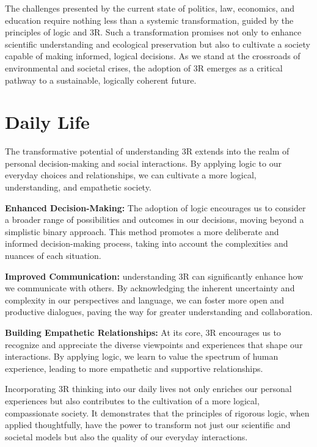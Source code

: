 \documentclass[12pt]{article}
\begin{document}
The challenges presented by the current state of politics, law, economics, and education require nothing less than a systemic transformation, guided by the principles of logic and 3R. Such a transformation promises not only to enhance scientific understanding and ecological preservation but also to cultivate a society capable of making informed, logical decisions. As we stand at the crossroads of environmental and societal crises, the adoption of 3R emerges as a critical pathway to a sustainable, logically coherent future.

\section*{Daily Life}

The transformative potential of understanding 3R extends into the realm of personal decision-making and social interactions. By applying \qbit{} logic to our everyday choices and relationships, we can cultivate a more logical, understanding, and empathetic society.

\textbf{Enhanced Decision-Making:} The adoption of \qbit{} logic encourages us to consider a broader range of possibilities and outcomes in our decisions, moving beyond a simplistic binary approach. This method promotes a more deliberate and informed decision-making process, taking into account the complexities and nuances of each situation.

\textbf{Improved Communication:} understanding 3R can significantly enhance how we communicate with others. By acknowledging the inherent uncertainty and complexity in our perspectives and language, we can foster more open and productive dialogues, paving the way for greater understanding and collaboration.

\textbf{Building Empathetic Relationships:} At its core, 3R encourages us to recognize and appreciate the diverse viewpoints and experiences that shape our interactions. By applying \qbit{} logic, we learn to value the spectrum of human experience, leading to more empathetic and supportive relationships.

Incorporating 3R thinking into our daily lives not only enriches our personal experiences but also contributes to the cultivation of a more logical, compassionate society. It demonstrates that the principles of rigorous logic, when applied thoughtfully, have the power to transform not just our scientific and societal models but also the quality of our everyday interactions.
\end{document}
